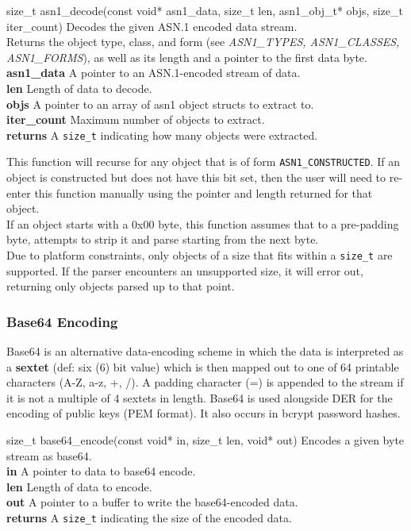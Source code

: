 \documentclass[titlepage]{article}
\begin{document}
				\begin{functionspec}[]{size\_t asn1\_decode(const void* asn1\_data, size\_t len, asn1\_obj\_t* objs, size\_t iter\_count)}
					Decodes the given ASN.1 encoded data stream.\\
					Returns the object type, class, and form (see \textit{ASN1\_TYPES, ASN1\_CLASSES, ASN1\_FORMS}), as well as its length and a pointer to the first data byte.\\
					\textbf{asn1\_data} A pointer to an ASN.1-encoded stream of data.\\
					\textbf{len} Length of data to decode.\\
					\textbf{objs} A pointer to an array of asn1 object structs to extract to.\\
					\textbf{iter\_count} Maximum number of objects to extract.\\
					\textbf{returns} A \texttt{size\_t} indicating how many objects were extracted.
					\begin{notespec}
						This function will recurse for any object that is of form \texttt{ASN1\_CONSTRUCTED}. If an object is constructed but does not have this bit set, then the user will need to re-enter this function manually using the pointer and length returned for that object.\\
						If an object starts with a 0x00 byte, this function assumes that to a pre-padding byte, attempts to strip it and parse starting from the next byte.\\
						Due to platform constraints, only objects of a size that fits within a \texttt{size\_t} are supported. If the parser encounters an unsupported size, it will error out, returning only objects parsed up to that point.
					\end{notespec}
				\end{functionspec}
			\subsubsection{Base64 Encoding}
				Base64 is an alternative data-encoding scheme in which the data is interpreted as a \textbf{sextet} (def: six (6) bit value) which is then mapped out to one of 64 printable characters (A-Z, a-z, +, /). A padding character (=) is appended to the stream if it is not a multiple of 4 sextets in length. Base64 is used alongside DER for the encoding of public keys (PEM format). It also occurs in bcrypt password hashes.
				
				\begin{functionspec}[]{size\_t base64\_encode(const void* in, size\_t len, void* out)}
					Encodes a given byte stream as base64.\\
					\textbf{in} A pointer to data to base64 encode.\\
					\textbf{len} Length of data to encode.\\
					\textbf{out} A pointer to a buffer to write the base64-encoded data.\\
					\textbf{returns} A \texttt{size\_t} indicating the size of the encoded data.
				\end{functionspec}
			
\end{document}
